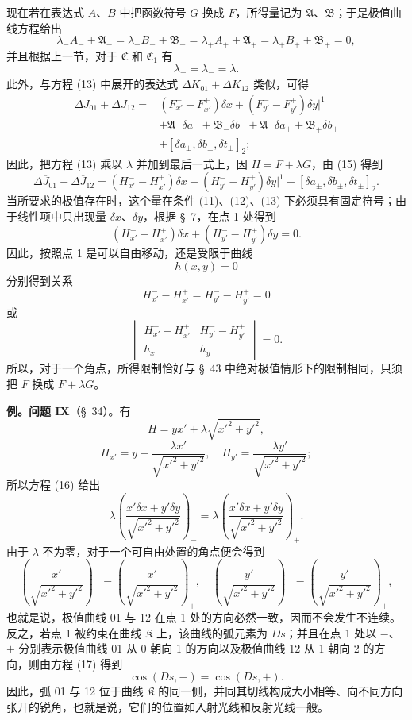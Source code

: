 \documentclass[11pt,a4paper,leqno]{article}
\begin{document}
现在若在表达式 $A$、$B$ 中把函数符号 $G$ 换成 $F$，所得量记为 $\mathfrak A$、$\mathfrak B$；于是极值曲线方程给出
\begin{equation}\tag{15}
\lambda_-A_-+\mathfrak A_-=
\lambda_-B_-+\mathfrak B_-=
\lambda_+A_+ +\mathfrak A_+=
\lambda_+B_+ +\mathfrak B_+=0,
\end{equation}
并且根据上一节，对于 $\mathfrak C$ 和 $\mathfrak C_1$ 有
\[
\lambda_+=\lambda_-=\lambda.
\]
此外，与方程 (13) 中展开的表达式 $\Delta\overline K_{01}+\Delta\overline K_{12}$ 类似，可得
\[
\begin{aligned}
\Delta\overline J_{01}+\Delta\overline J_{12}
={}&(F_{x'}^- -F_{x'}^+)\delta x+(F_{y'}^- -F_{y'}^+)\delta y\bigg|^1\\
&+\mathfrak A_-\delta a_-+\mathfrak B_-\delta b_-+\mathfrak A_+\delta a_+ +\mathfrak B_+\delta b_+ \\
&+[\delta a_\pm,\delta b_\pm,\delta t_\pm]_2;
\end{aligned}
\]
因此，把方程 (13) 乘以 $\lambda$ 并加到最后一式上，因 $H=F+\lambda G$，由 (15) 得到
\[
\Delta\overline J_{01}+\Delta\overline J_{12}
=(H_{x'}^- -H_{x'}^+)\delta x+(H_{y'}^- -H_{y'}^+)\delta y\bigg|^1
+[\delta a_\pm,\delta b_\pm,\delta t_\pm]_2.
\]
当所要求的极值存在时，这个量在条件 (11)、(12)、(13) 下必须具有固定符号；由于线性项中只出现量 $\delta x$、$\delta y$，根据 \S~7，在点 1 处得到
\begin{equation}\tag{16}
(H_{x'}^- -H_{x'}^+)\delta x+(H_{y'}^- -H_{y'}^+)\delta y=0.
\end{equation}
因此，按照点 1 是可以自由移动，还是受限于曲线
\[
h(x,y)=0
\]
分别得到关系
\[
H_{x'}^- -H_{x'}^+=H_{y'}^- -H_{y'}^+=0
\]
或
\[
\begin{vmatrix}
H_{x'}^- -H_{x'}^+&H_{y'}^- -H_{y'}^+\\
h_x&h_y
\end{vmatrix}=0.
\]
所以，对于一个角点，所得限制恰好与 \S~43 中绝对极值情形下的限制相同，只须把 $F$ 换成 $F+\lambda G$。

\textbf{例。问题 IX}（\S~34）。有
\[
H=yx' +\lambda\sqrt{x'^2+y'^2},
\]
\[
H_{x'}=y+\frac{\lambda x'}{\sqrt{x'^2+y'^2}},
\quad
H_{y'}=\frac{\lambda y'}{\sqrt{x'^2+y'^2}};
\]
所以方程 (16) 给出
\begin{equation}\tag{17}
\lambda\left(\frac{x'\delta x+y'\delta y}{\sqrt{x'^2+y'^2}}\right)_-
=
\lambda\left(\frac{x'\delta x+y'\delta y}{\sqrt{x'^2+y'^2}}\right)_+.
\end{equation}
由于 $\lambda$ 不为零，对于一个可自由处置的角点便会得到
\[
\left(\frac{x'}{\sqrt{x'^2+y'^2}}\right)_-
=
\left(\frac{x'}{\sqrt{x'^2+y'^2}}\right)_+,
\quad
\left(\frac{y'}{\sqrt{x'^2+y'^2}}\right)_-
=
\left(\frac{y'}{\sqrt{x'^2+y'^2}}\right)_+,
\]
也就是说，极值曲线 01 与 12 在点 1 处的方向必然一致，因而不会发生不连续。反之，若点 1 被约束在曲线 $\mathfrak K$ 上，该曲线的弧元素为 $Ds$；并且在点 1 处以 $-$、$+$ 分别表示极值曲线 01 从 0 朝向 1 的方向以及极值曲线 12 从 1 朝向 2 的方向，则由方程 (17) 得到
\[
\cos(Ds,-)=\cos(Ds,+).
\]
因此，弧 01 与 12 位于曲线 $\mathfrak K$ 的同一侧，并同其切线构成大小相等、向不同方向张开的锐角，也就是说，它们的位置如入射光线和反射光线一般。
\end{document}
